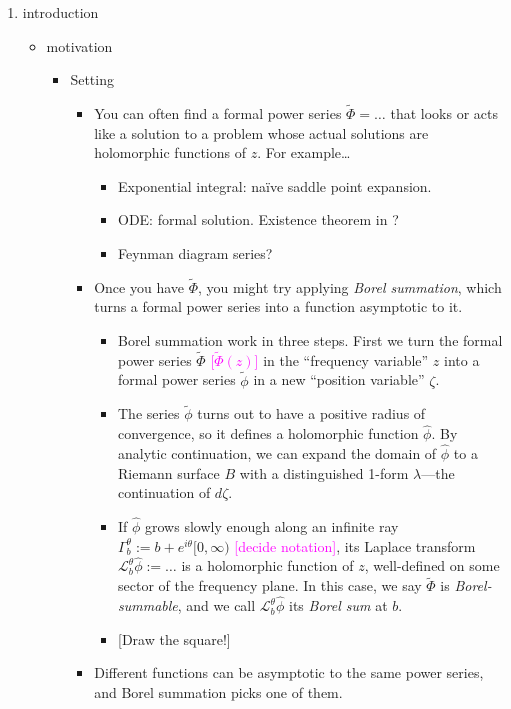 \documentclass{article}
\newcommand{\laplace}{\mathcal{L}}
\begin{document}
\begin{enumerate}
\item introduction
\begin{itemize}
\item motivation
\begin{itemize}
\item Setting
\begin{itemize}
\item You can often find a formal power series $\tilde{\Phi} = \ldots$ that looks or acts like a solution to a problem whose actual solutions are holomorphic functions of $z$. For example\ldots
\begin{itemize}
\item Exponential integral: na\"{i}ve saddle point expansion.
\item ODE: formal solution. Existence theorem in \cite{diverg-resurg-iii}?
\item Feynman diagram series?
\end{itemize}
\item Once you have $\tilde{\Phi}$, you might try applying {\em Borel summation}, which turns a formal power series into a function asymptotic to it.
\begin{itemize}
\item Borel summation work in three steps. First we turn the formal power series $\tilde{\Phi}$ \textcolor{magenta}{[$\tilde{\Phi}(z)$]} in the ``frequency variable'' $z$ into a formal power series $\tilde{\phi}$ in a new ``position variable'' $\zeta$.
\item The series $\tilde{\phi}$ turns out to have a positive radius of convergence, so it defines a holomorphic function $\hat{\phi}$. By analytic continuation, we can expand the domain of $\hat{\phi}$ to a Riemann surface $B$ with a distinguished 1-form $\lambda$---the continuation of $d\zeta$.
\item If $\hat{\phi}$ grows slowly enough along an infinite ray $\Gamma_b^\theta := b + e^{i\theta}[0, \infty)$ \textcolor{magenta}{[decide notation]}, its Laplace transform $\laplace_b^\theta \hat{\phi} := \ldots$ is a holomorphic function of $z$, well-defined on some sector of the frequency plane. In this case, we say $\tilde{\Phi}$ is {\em Borel-summable}, and we call $\laplace_b^\theta \hat{\phi}$ its {\em Borel sum} at $b$.
\item {[Draw the square!]}
\end{itemize}
\item Different functions can be asymptotic to the same power series, and Borel summation picks one of them.

\end{itemize}
\end{itemize}
\end{itemize}
\end{enumerate}
\end{document}
